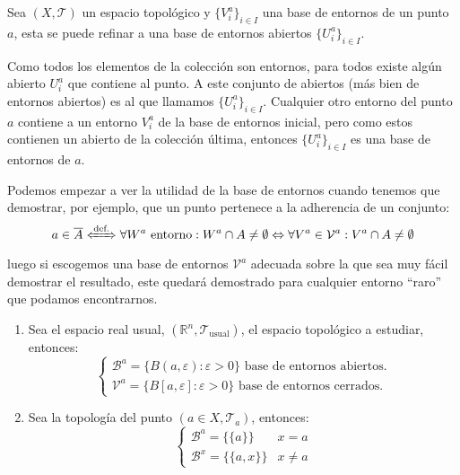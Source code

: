 \begin{prop}
Sea $(X,\mathcal{T})$ un espacio topológico y $\{V_i^a \}_{i\in I}$ una base de entornos de un punto $a$, esta se puede refinar a una base de entornos abiertos $\{U_i^a\}_{i\in I}$. 
\end{prop}
\begin{demo}    
Como todos los elementos de la colección son entornos, para todos existe algún abierto $U_i^a$ que contiene al punto. A este conjunto de abiertos (más bien de entornos abiertos) es al que llamamos $\{U_i^a\}_{i\in I}$. Cualquier otro entorno del punto $a$ contiene a un entorno $V_i^a$ de la base de entornos inicial, pero como estos contienen un abierto de la colección última, entonces $\{U_i^a\}_{i\in I}$ es una base de entornos de  $a$.
\end{demo}

\begin{obs}    
Podemos empezar a ver la utilidad de la base de entornos cuando tenemos que demostrar, por ejemplo, que un punto pertenece a la adherencia de un conjunto:
$$
a \in \overline{A} \xLeftrightarrow{\text{def.}} \forall W^a \text{ entorno}: W^a \cap A \neq \emptyset \Leftrightarrow \forall V^a \in \mathcal{V}^a: V^a\cap A \neq \emptyset
$$
luego si escogemos una base de entornos $\mathcal{V}^a$ adecuada sobre la que sea muy fácil demostrar el resultado, este quedará demostrado para cualquier entorno ``raro'' que podamos encontrarnos.
\end{obs}

\begin{ej}
\begin{enumerate}
    \item Sea el espacio real usual, $(\mathbb{R}^n, \mathcal{T}_{\text{usual}})$, el espacio topológico a estudiar, entonces:
    $$
    \begin{cases}
    \mathcal{B}^a = \{B\left( a, \varepsilon \right): \varepsilon > 0\} \text{ base de entornos abiertos.}  \\
    \mathcal{V}^a = \{B\left[ a, \varepsilon \right]: \varepsilon > 0\} \text{ base de entornos cerrados.} 
    \end{cases} 
    $$
    \item Sea la topología del punto $(a \in X, \mathcal{T}_a)$, entonces:
	$$
	\begin{cases}
	\mathcal{B}^a = \{\{a\}\} & x = a\\
	\mathcal{B}^x = \{\{a, x\}\} & x \neq a
	\end{cases}
	$$
\end{enumerate}
\end{ej}

